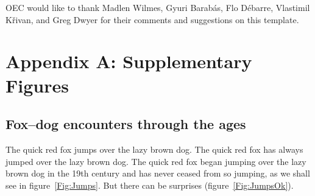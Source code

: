 \documentclass[11pt]{article}
\begin{document}
OEC would like to thank Madlen Wilmes, Gyuri Barab\'{a}s, Flo D\'{e}barre, Vlastimil K\v{r}ivan, and Greg Dwyer for their comments and suggestions on this template.

\newpage{}

\section*{Appendix A: Supplementary Figures}

%
%
%
%
%

\renewcommand{\theequation}{A\arabic{equation}}
\renewcommand{\thetable}{A\arabic{table}}
\setcounter{equation}{0}  %
\setcounter{figure}{0}
\setcounter{table}{0}

\subsection*{Fox--dog encounters through the ages}

The quick red fox jumps over the lazy brown dog. The quick red fox has always jumped over the lazy brown dog. The quick red fox began jumping over the lazy brown dog in the 19th century and has never ceased from so jumping, as we shall see in figure~\ref{Fig:Jumps}. But there can be surprises (figure~\ref{Fig:JumpsOk}).
\end{document}
